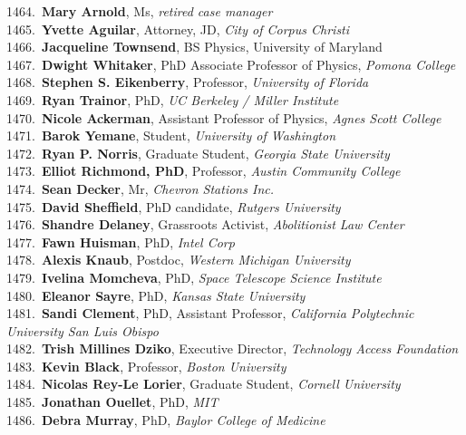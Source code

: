 1464.~{\bf Mary Arnold}, Ms, {\sl retired  case manager } \\
1465.~{\bf Yvette Aguilar}, Attorney, JD, {\sl City of Corpus Christi} \\
1466.~{\bf Jacqueline Townsend}, BS Physics, University of Maryland \\
1467.~{\bf Dwight Whitaker}, PhD Associate Professor of Physics, {\sl Pomona College} \\
1468.~{\bf Stephen S. Eikenberry}, Professor, {\sl University of Florida} \\
1469.~{\bf Ryan Trainor}, PhD, {\sl UC Berkeley / Miller Institute} \\
1470.~{\bf Nicole Ackerman}, Assistant Professor of Physics, {\sl Agnes Scott College} \\
1471.~{\bf Barok Yemane}, Student, {\sl University of Washington} \\
1472.~{\bf Ryan P. Norris}, Graduate Student, {\sl Georgia State University} \\
1473.~{\bf Elliot Richmond, PhD}, Professor, {\sl Austin Community College} \\
1474.~{\bf Sean Decker}, Mr, {\sl Chevron Stations Inc.} \\
1475.~{\bf David Sheffield}, PhD candidate, {\sl Rutgers University} \\
1476.~{\bf Shandre Delaney}, Grassroots Activist, {\sl Abolitionist Law Center} \\
1477.~{\bf Fawn Huisman}, PhD, {\sl Intel Corp} \\
1478.~{\bf Alexis Knaub}, Postdoc, {\sl Western Michigan University} \\
1479.~{\bf Ivelina Momcheva}, PhD, {\sl Space Telescope Science Institute} \\
1480.~{\bf Eleanor Sayre}, PhD, {\sl Kansas State University} \\
1481.~{\bf Sandi Clement}, PhD, Assistant Professor, {\sl California Polytechnic University San Luis Obispo} \\
1482.~{\bf Trish Millines Dziko}, Executive Director, {\sl Technology Access Foundation} \\
1483.~{\bf Kevin Black}, Professor, {\sl Boston University} \\
1484.~{\bf Nicolas Rey-Le Lorier}, Graduate Student, {\sl Cornell University} \\
1485.~{\bf Jonathan Ouellet}, PhD, {\sl MIT} \\
1486.~{\bf Debra Murray}, PhD, {\sl Baylor College of Medicine} \\
